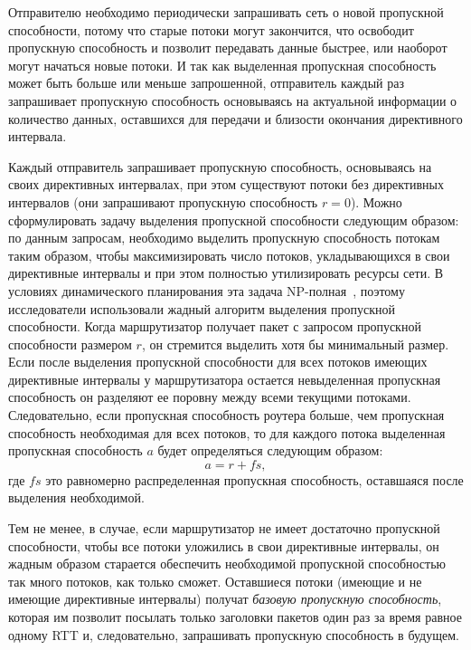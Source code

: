 \documentclass[14pt, a4paper,oneside]{extarticle}
\begin{document}
Отправителю необходимо периодически запрашивать сеть о новой пропускной способности, потому что старые потоки могут закончится, что освободит пропускную способность и позволит передавать данные быстрее, или наоборот могут начаться новые потоки. И так как выделенная пропускная способность может быть больше или меньше запрошенной, отправитель каждый раз запрашивает пропускную способность основываясь на актуальной информации о количество данных, оставшихся для передачи и близости окончания директивного интервала.

Каждый отправитель запрашивает пропускную способность, основываясь на своих директивных интервалах, при этом существуют потоки без директивных интервалов (они запрашивают пропускную способность $r = 0$). Можно сформулировать задачу выделения пропускной способности следующим образом: по данным запросам, необходимо выделить пропускную способность потокам таким образом, чтобы максимизировать число потоков, укладывающихся в свои директивные интервалы и при этом полностью утилизировать ресурсы сети.
В условиях динамического планирования эта задача NP-полная~\cite{np-complete}, поэтому исследователи использовали жадный алгоритм выделения пропускной способности. Когда маршрутизатор получает пакет с запросом пропускной способности размером $r$, он стремится выделить хотя бы минимальный размер. Если после выделения пропускной способности для всех потоков имеющих директивные интервалы у маршрутизатора остается невыделенная пропускная способность он разделяют ее поровну между всеми текущими потоками. Следовательно, если пропускная способность роутера больше, чем пропускная способность необходимая для всех потоков, то для каждого потока выделенная пропускная способность $a$ будет определяться следующим образом: 
$$ a = r + fs, $$
где $fs$ это равномерно распределенная пропускная способность, оставшаяся после выделения необходимой.

Тем не менее, в случае, если маршрутизатор не имеет достаточно пропускной способности, чтобы все потоки уложились в свои директивные интервалы, он жадным образом старается обеспечить необходимой пропускной способностью так много потоков, как только сможет. Оставшиеся потоки (имеющие и не имеющие директивные интервалы) получат \emph{базовую пропускную способность}, которая им позволит посылать только заголовки пакетов один раз за время равное одному RTT и, следовательно, запрашивать пропускную способность в будущем.
\end{document}

